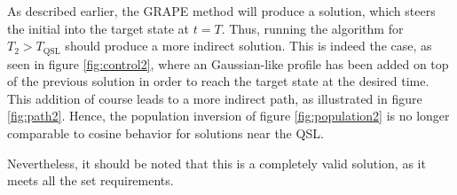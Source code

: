 As described earlier, the GRAPE method will produce a solution, which steers the initial into the target state at $t = T$. Thus, running the algorithm for $T_2 > T_{\mathrm{QSL}}$ should produce a more indirect solution.
This is indeed the case, as seen in figure \ref{fig:control2}, where an Gaussian-like profile has been added on top of the previous solution in order to reach the target state at the desired time. This addition of course leads to a more indirect path, as illustrated in figure \ref{fig:path2}. Hence, the population inversion of figure \ref{fig:population2} is no longer comparable to cosine behavior for solutions near the QSL.

Nevertheless, it should be noted that this is a completely valid solution, as it meets all the set requirements.